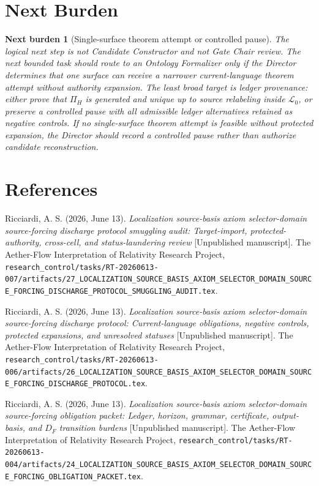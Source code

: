 \documentclass[11pt]{article}
\newcommand{\Lang}{\mathcal{L}_{0}}
\newtheorem{nextburden}{Next burden}
\begin{document}
\section{Next Burden}

\begin{nextburden}[Single-surface theorem attempt or controlled pause]
The logical next step is not Candidate Constructor and not Gate Chair review.
The next bounded task should route to an Ontology Formalizer only if the
Director determines that one surface can receive a narrower current-language
theorem attempt without authority expansion. The least broad target is
ledger provenance: either prove that \(\Pi_H\) is generated and unique up to
source relabeling inside \(\Lang\), or preserve a controlled pause with all
admissible ledger alternatives retained as negative controls. If no
single-surface theorem attempt is feasible without protected expansion, the
Director should record a controlled pause rather than authorize candidate
reconstruction.
\end{nextburden}

\section*{References}

Ricciardi, A. S. (2026, June 13). \emph{Localization source-basis axiom
selector-domain source-forcing discharge protocol smuggling audit:
Target-import, protected-authority, cross-cell, and status-laundering
review} [Unpublished manuscript]. The Aether-Flow Interpretation of
Relativity Research Project,
\texttt{research\_control/tasks/RT-20260613-007/artifacts/27\_LOCALIZATION\_SOURCE\_BASIS\_AXIOM\_SELECTOR\_DOMAIN\_SOURCE\_FORCING\_DISCHARGE\_PROTOCOL\_SMUGGLING\_AUDIT.tex}.

Ricciardi, A. S. (2026, June 13). \emph{Localization source-basis axiom
selector-domain source-forcing discharge protocol: Current-language
obligations, negative controls, protected expansions, and unresolved
statuses} [Unpublished manuscript]. The Aether-Flow Interpretation of
Relativity Research Project,
\texttt{research\_control/tasks/RT-20260613-006/artifacts/26\_LOCALIZATION\_SOURCE\_BASIS\_AXIOM\_SELECTOR\_DOMAIN\_SOURCE\_FORCING\_DISCHARGE\_PROTOCOL.tex}.

Ricciardi, A. S. (2026, June 13). \emph{Localization source-basis axiom
selector-domain source-forcing obligation packet: Ledger, horizon, grammar,
certificate, output-basis, and \(D_F\) transition burdens} [Unpublished
manuscript]. The Aether-Flow Interpretation of Relativity Research Project,
\texttt{research\_control/tasks/RT-20260613-004/artifacts/24\_LOCALIZATION\_SOURCE\_BASIS\_AXIOM\_SELECTOR\_DOMAIN\_SOURCE\_FORCING\_OBLIGATION\_PACKET.tex}.
\end{document}
